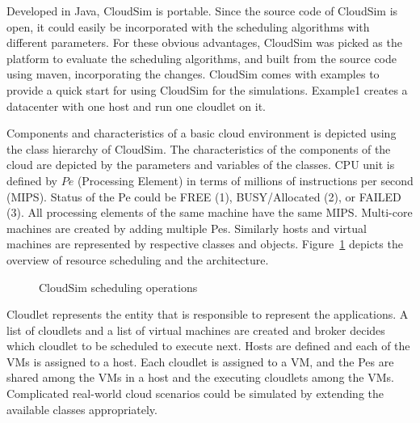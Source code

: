 \documentclass[times, 10pt,twocolumn]{article}
\begin{document}
Developed in Java, CloudSim is portable. Since the source code of CloudSim is open, it could easily be incorporated with the scheduling algorithms with different parameters. For these obvious advantages, CloudSim was picked as the platform to evaluate the scheduling algorithms, and built from the source code using maven, incorporating the changes. CloudSim comes with examples to provide a quick start for using CloudSim for the simulations. Example1 creates a datacenter with one host and run one cloudlet on it. 

Components and characteristics of a basic cloud environment is depicted using the class hierarchy of CloudSim. The characteristics of the components of the cloud are depicted by the parameters and variables of the classes. CPU unit is defined by $Pe$ (Processing Element) in terms of millions of instructions per second (MIPS). Status of the Pe could be FREE (1), BUSY/Allocated (2), or FAILED (3). All processing elements of the same machine have the same MIPS. Multi-core machines are created by adding multiple Pes. Similarly hosts and virtual machines are represented by respective classes and objects. Figure~\ref{fig:scheduling} depicts the overview of resource scheduling and the architecture.
\begin{figure}[ht]
 \caption{CloudSim scheduling operations}
 \label{fig:scheduling}
\end{figure}
Cloudlet represents the entity that is responsible to represent the applications. A list of cloudlets and a list of virtual machines are created and broker decides which cloudlet to be scheduled to execute next. Hosts are defined and each of the VMs is assigned to a host. Each cloudlet is assigned to a VM, and the Pes are shared among the VMs in a host and the executing cloudlets among the VMs. Complicated real-world cloud scenarios could be simulated by extending the available classes appropriately.
\end{document}
